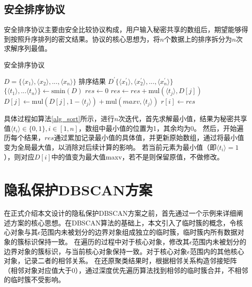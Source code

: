 \subsection{安全排序协议}
安全排序协议主要由安全比较协议构成，用户输入秘密共享的数组后，期望能够得到按照升序排列的密文结果。协议的核心思想为，将$ n $个数据上的排序拆分为$ n $次求解序列最值。
\begin{algorithm}[htbp]
	\renewcommand{\algorithmicrequire}{\textbf{输入:}}
	\renewcommand{\algorithmicensure}{\textbf{输出:}}
	\caption{安全排序协议}
	\label{alg_sort}
	\begin{algorithmic}[1]
		\REQUIRE $ D = \{\langle  x_1 \rangle, \langle  x_2 \rangle,...,\langle  x_n \rangle\} $
		\ENSURE 排序结果 $ D^{\prime}\{\langle  x^{\prime}_1 \rangle, \langle  x^{\prime}_2 \rangle,...,\langle  x^{\prime}_n \rangle\} $
		\STATE $ \{\langle  t_1 \rangle,...\langle  t_n \rangle\} \leftarrow \text{smin}(D)$
		\STATE $ res \leftarrow 0 $
		\STATE $ res \leftarrow res + \text{mul}(\langle  t_j \rangle, D[j]) $
		\STATE $ D[j] \leftarrow \text{mul}(D[j],1-\langle  t_j \rangle) + \text{mul}(maxv, \langle  t_j \rangle)$
		\ENDFOR
		\STATE $ r[i] \leftarrow res $
		\ENDFOR
	\end{algorithmic}
\end{algorithm}

具体过程如算法\ref{alg_sort}所示，进行$ n $次迭代，首先求解最小值，结果为秘密共享值$ \langle t_i \rangle \in \{0,1\}, i\in[1,n] $，数组中最小值的位置为1，其余均为0。
然后，开始遍历每个结果，$ res $通过累加记录最小值的具体值，并更新原始数组，通过将最小值变为全局最大值，以消除对后续计算的影响。
若当前元素为最小值（即$\langle t_i \rangle=1  $ ），则对应$ D[i] $中的值变为最大值maxv，若不是则保留原值，不做修改。


\section{隐私保护DBSCAN方案}
\label{s4-t1}
在正式介绍本文设计的隐私保护DBSCAN方案之前，首先通过一个示例来详细阐述方案的核心思想。在DBSCAN算法的基础上，本文引入了临时簇的概念，令核心对象与其$ \epsilon $范围内未被划分的边界对象组成独立的临时簇，临时簇内所有数据对象的簇标识保持一致。
在遍历的过程中对于核心对象，修改其$ \epsilon $范围内未被划分的边界对象的簇标识，与当前核心对象保持一致。对于核心对象$ \epsilon $范围内的其他核心对象，记录二者的相邻关系。
在还原聚类结果时，根据相邻关系构造邻接矩阵（相邻对象对应值大于0），通过深度优先遍历算法找到相邻的临时簇合并，不相邻的临时簇不受影响。

